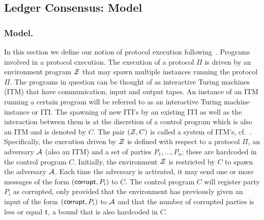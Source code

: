 \subsection{Ledger Consensus: Model}

\subsubsection{Model.}

In this section we define our notion of protocol execution following~\cite{DBLP:conf/eurocrypt/GarayKL15,DBLP:conf/focs/Canetti01}.
Programs involved in a protocol execution. The execution of a protocol $\Pi$ is driven by an
environment program $\mathcal{Z}$ that may spawn multiple instances running the protocol $\Pi$. The programs
in question can be thought of as interactive Turing machines (ITM) that have communication,
input and output tapes. An instance of an ITM running a certain program will be referred to as
an interactive Turing machine instance or ITI. The spawning of new ITI's by an existing ITI as
well as the interaction between them is at the discretion of a control program which is also an ITM
and is denoted by $C$. The pair $(\mathcal{Z}, C)$ is called a system of ITM's, cf.~\cite{DBLP:conf/focs/Canetti01}. 
Specifically, the execution driven by $\mathcal{Z}$ is defined with respect to a protocol $\Pi$, an adversary $\mathcal{A}$
(also an ITM) and a set of parties $P_1,\dots,P_n$; these are hardcoded in the control program $C$. 
Initially, the environment $\mathcal{Z}$ is restricted by $C$ to spawn the adversary $\mathcal{A}$. Each time the
adversary is activated, it may send one or more messages of the form $(\mathsf{corrupt}, P_i)$ to $C$. The control
program $C$ will register party $P_i$ as corrupted, only provided that the environment has previously
given an input of the form $(\mathsf{corrupt}, P_i)$ to $\mathcal{A}$ and that the number of corrupted parties is less or
equal $\mathsf{t}$, a bound that is also hardcoded in $C$. 




